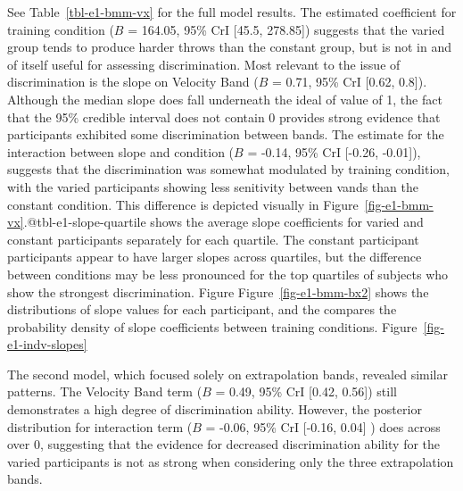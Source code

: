 \documentclass[
  letterpaper,
  DIV=11,
  numbers=noendperiod,
  oneside]{scrartcl}
\begin{document}
See Table~\ref{tbl-e1-bmm-vx} for the full model results. The estimated
coefficient for training condition (\(B\) = 164.05, 95\% CrI {[}45.5,
278.85{]}) suggests that the varied group tends to produce harder throws
than the constant group, but is not in and of itself useful for
assessing discrimination. Most relevant to the issue of discrimination
is the slope on Velocity Band (\(B\) = 0.71, 95\% CrI {[}0.62, 0.8{]}).
Although the median slope does fall underneath the ideal of value of 1,
the fact that the 95\% credible interval does not contain 0 provides
strong evidence that participants exhibited some discrimination between
bands. The estimate for the interaction between slope and condition
(\(B\) = -0.14, 95\% CrI {[}-0.26, -0.01{]}), suggests that the
discrimination was somewhat modulated by training condition, with the
varied participants showing less senitivity between vands than the
constant condition. This difference is depicted visually in
Figure~\ref{fig-e1-bmm-vx}.@tbl-e1-slope-quartile shows the average
slope coefficients for varied and constant participants separately for
each quartile. The constant participant participants appear to have
larger slopes across quartiles, but the difference between conditions
may be less pronounced for the top quartiles of subjects who show the
strongest discrimination. Figure Figure~\ref{fig-e1-bmm-bx2} shows the
distributions of slope values for each participant, and the compares the
probability density of slope coefficients between training conditions.
Figure~\ref{fig-e1-indv-slopes}

The second model, which focused solely on extrapolation bands, revealed
similar patterns. The Velocity Band term (\(B\) = 0.49, 95\% CrI
{[}0.42, 0.56{]}) still demonstrates a high degree of discrimination
ability. However, the posterior distribution for interaction term (\(B\)
= -0.06, 95\% CrI {[}-0.16, 0.04{]} ) does across over 0, suggesting
that the evidence for decreased discrimination ability for the varied
participants is not as strong when considering only the three
extrapolation bands.
\end{document}
